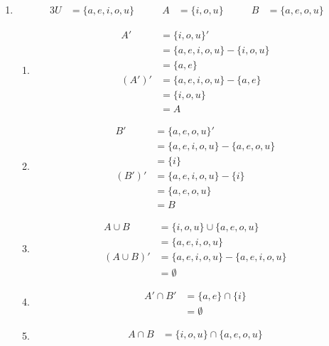 \documentclass[../notes.tex]{subfiles}
\begin{document}
\begin{enumerate}
        \item
          \begin{alignat*}{3}
            U &= \{a, e, i, o, u\} \qquad & A &= \{i, o, u\} \qquad & B &= \{a, e, o, u\}
          \end{alignat*}
          \begin{enumerate}[label=(\alph*)]
            \item
              \begin{align*}
                A' &= \{i, o, u\}'\\
                &= \{a, e, i, o, u\} - \{i, o, u\}\\
                &= \{a, e\}\\
                \left(A'\right)' &= \{a, e, i, o, u\} - \{a, e\}\\
                &= \{i, o, u\}\\
                &= A
              \end{align*}
            \item
              \begin{align*}
                B' &= \{a, e, o, u\}'\\
                &= \{a, e, i, o, u\} - \{a, e, o, u\}\\
                &= \{i\}\\
                \left(B'\right)' &= \{a, e, i, o, u\} - \{i\}\\
                &= \{a, e, o, u\}\\
                &= B
              \end{align*}
            \item
              \begin{align*}
                A \cup B &= \{i, o, u\} \cup \{a, e, o, u\}\\
                &= \{a, e, i, o, u\}\\
                (A \cup B)' &= \{a, e, i, o, u\} - \{a, e, i, o, u\}\\
                &= \emptyset
              \end{align*}
            \item
              \begin{align*}
                A' \cap B' &= \{a, e\} \cap \{i\}\\
                &= \emptyset
              \end{align*}
            \item
              \begin{align*}
                A \cap B &= \{i, o, u\} \cap \{a, e, o, u\}\\

\end{align*}
\end{enumerate}
\end{enumerate}
\end{document}
